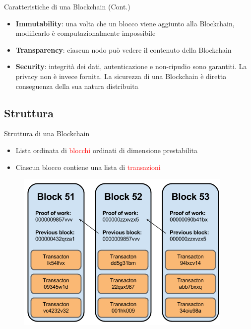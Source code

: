 \documentclass{beamer}
\newcommand\red[1]{\textcolor{red}{#1}}
\begin{document}
  \begin{frame}{Caratteristiche di una Blockchain (Cont.)}
    \begin{itemize}
      \item \textbf{Immutability}: una volta che un blocco viene aggiunto alla Blockchain, modificarlo è computazionalmente impossibile \pause
      \item \textbf{Transparency}: ciascun nodo può vedere il contenuto della Blockchain \pause
      \item \textbf{Security}: integrità dei dati, autenticazione e non-ripudio sono garantiti. La privacy non è invece fornita. La sicurezza di una Blockchain è diretta conseguenza della sua natura distribuita
    \end{itemize}
  \end{frame}



  \subsection{Struttura}
  \begin{frame}{Struttura di una Blockchain}
    \begin{itemize}
      \item Lista ordinata di \red{blocchi} ordinati di dimensione prestabilita 
      \item Ciascun blocco contiene una lista di \red{transazioni}
    \end{itemize}

    \begin{figure}[!htb]
      \centering
      \includegraphics[width=0.45\linewidth]{../img/blockchain-basic-schema.png}
    \end{figure}
  \end{frame}
\end{document}
